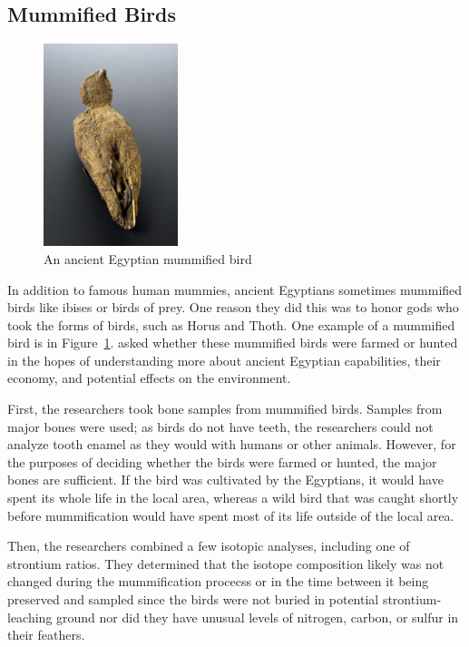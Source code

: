 \documentclass[a4paper, 12pt]{article}
\begin{document}
\subsection{Mummified Birds}
\begin{figure}[htbp]
    \centering
    \includegraphics[width=0.35\textwidth]{mummy_bird.jpg}
    \caption{An ancient Egyptian mummified bird \citep{wikipediaBird}}
    \label{fig:mummy_bird}
\end{figure}
In addition to famous human mummies, ancient Egyptians sometimes mummified birds
like ibises or birds of prey. One reason they did this was to honor gods who took
the forms of birds, such as Horus and Thoth. One example of a mummified bird is in Figure~\ref{fig:mummy_bird}.
\cite{linglin2020} asked whether these mummified birds were farmed or hunted in the hopes of understanding
more about ancient Egyptian capabilities, their economy, and potential effects on
the environment.

First, the researchers took bone samples from mummified birds. Samples from major bones were used;
as birds do not have teeth, the researchers could not analyze tooth enamel as they would
with humans or other animals. However, for the purposes of deciding whether the birds
were farmed or hunted, the major bones are sufficient. If the bird was cultivated by the
Egyptians, it would have spent its whole life in the local area, whereas a wild bird
that was caught shortly before mummification would have spent most of its life outside
of the local area.

Then, the researchers combined a few isotopic analyses, including one of strontium ratios.
They determined that the isotope composition likely was not changed during the mummification
procecss or in the time between it being preserved and sampled since the birds were not
buried in potential strontium-leaching ground nor did they have unusual levels
of nitrogen, carbon, or sulfur in their feathers.
\end{document}
